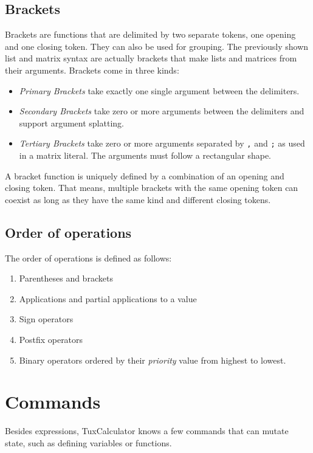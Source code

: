 \documentclass[10pt]{article}
\begin{document}
    \subsection{Brackets}\label{subsec:brackets}
    Brackets are functions that are delimited by two separate tokens, one opening and one closing token.
    They can also be used for grouping.
    The previously shown list and matrix syntax are actually brackets that make lists and matrices from their arguments.
    Brackets come in three kinds:
    \begin{itemize}
        \item \textsl{Primary Brackets} take exactly one single argument between the delimiters.
        \item \textsl{Secondary Brackets} take zero or more arguments between the delimiters and support argument splatting.
        \item \textsl{Tertiary Brackets} take zero or more arguments separated by \verb|,| and \verb|;| as used in a matrix literal.
              The arguments must follow a rectangular shape.
    \end{itemize}
    A bracket function is uniquely defined by a combination of an opening and closing token.
    That means, multiple brackets with the same opening token can coexist as long as they have the same kind and different closing tokens.
    
    \subsection{Order of operations}\label{subsec:order-of-operations}
    The order of operations is defined as follows:
    \begingroup
    \setlength{\parskip}{0pt}
    \begin{enumerate}
        \item Parentheses and brackets
        \item Applications and partial applications to a value
        \item Sign operators
        \item Postfix operators
        \item Binary operators ordered by their \textsl{priority} value from highest to lowest.
    \end{enumerate}
    \endgroup
    
    \section{Commands}\label{sec:commands}
    Besides expressions, TuxCalculator knows a few commands that can mutate state, such as defining variables or functions.
    
\end{document}
